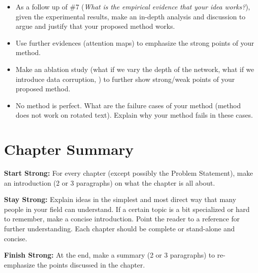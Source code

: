 \label{ch:analysis}

\begin{itemize}
    \item As a follow up of \#7 (\emph{What is the empirical evidence that your idea works?}), given the experimental results, make an in-depth analysis and discussion to argue and justify that your proposed method works.
    \item Use further evidences (\eg attention maps) to emphasize the strong points of your method.
    \item Make an ablation study (\eg what if we vary the depth of the network, what if we introduce data corruption, \etc) to further show strong/weak points of your proposed method.
    \item No method is perfect. What are the failure cases of your method (\eg method does not work on rotated text). Explain why your method fails in these cases.
\end{itemize}

\section{Chapter Summary}

\textbf{Start Strong:} For every chapter (except possibly the Problem Statement), make an introduction (2 or 3 paragraphs) on what the chapter is all about.

\textbf{Stay Strong:} Explain ideas in the simplest and most direct way that many people in your field can understand. If a certain topic is a bit specialized or hard to remember, make a concise introduction. Point the reader to a reference for further understanding. Each chapter should be complete or stand-alone and concise.

\textbf{Finish Strong:} At the end, make a summary (2 or 3 paragraphs) to re-emphasize the points discussed in the chapter.

